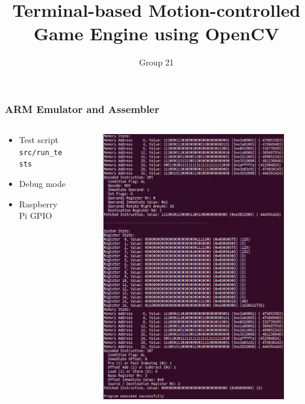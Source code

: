 \documentclass{beamer}
\title{Terminal-based Motion-controlled Game Engine using OpenCV}
\author{Group 21}
\begin{document}
	
\frame{\titlepage}

\begin{frame}
	\frametitle{ARM Emulator and Assembler}
	\begin{columns}
		\begin{column}{0.5\textwidth}
			\begin{itemize}
				\item Test script \texttt{src/run\_tests}
				\item Debug mode
				\item Raspberry Pi GPIO
			\end{itemize}
		\end{column}
		\begin{column}{0.5\textwidth}
			\begin{figure}
				\includegraphics[width=\textwidth]{Presentation/emulate.png}
			\end{figure}
		\end{column}
	\end{columns}
\end{frame}
\end{document}
